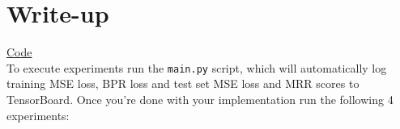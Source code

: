 \documentclass[12pt]{article}
\begin{document}




    \section{Write-up}
    \href{https://github.com/seokjeongeum/cs330/tree/master/hw0_starter_code}{Code}\\
    To execute experiments run the \texttt{main.py} script, which will automatically log training MSE loss, BPR loss and test set MSE loss and MRR scores to TensorBoard. Once you're done with your implementation run the following 4 experiments:
\end{document}
